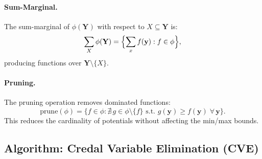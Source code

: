 \documentclass{article}
\begin{document}
\paragraph{Sum-Marginal.}
The sum-marginal of $\phi(\mathbf{Y})$ with respect to $X \subseteq \mathbf{Y}$ is:
\[
  \sum_{X} \phi(\mathbf{Y}) = \Bigl\{ \sum_{x} f(\mathbf{y}) : f \in \phi \Bigr\},
\]
producing functions over $\mathbf{Y} \setminus \{X\}$.

\paragraph{Pruning.}
The pruning operation removes dominated functions:
\[
  \mathrm{prune}(\phi) = \{f \in \phi : \nexists\, g \in \phi \setminus \{f\}
  \text{ s.t.\ } g(\mathbf{y}) \geq f(\mathbf{y})\; \forall\, \mathbf{y}\}.
\]
This reduces the cardinality of potentials without affecting the min/max bounds.

\subsection{Algorithm: Credal Variable Elimination (CVE)}
\end{document}
